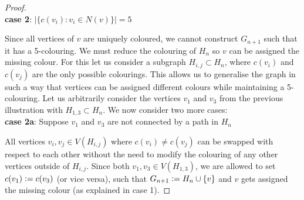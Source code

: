 \begin{proof}
$\phantom{x}$ \\
\textbf{case 2}: $|\{c(v_{i}) : v_{i} \in N(v)\}| = 5$

Since all vertices of $v$ are uniquely coloured, we cannot construct $G_{n + 1}$ such that it has a 5-colouring. We must reduce the colouring of $H_{n}$ so $v$ can be assigned the missing colour. For this let us consider a subgraph $H_{i, j} \subset H_{n}$, where $c(v_{i})$ and $c(v_{j})$ are the only possible colourings. This allows us to generalise the graph in such a way that vertices can be assigned different colours while maintaining a 5-colouring. Let us arbitrarily consider the vertices $v_{1}$ and $v_{3}$ from the previous illustration with $H_{1, 3} \subset H_{n}$. We now consider two more cases: \\
\textbf{case 2a}: Suppose $v_1$ and $v_3$ are not connected by a path in $H_{n}$

All vertices $v_i, v_j \in V(H_{i, j})$ where $c(v_i) \not = c(v_j)$ can be swapped with respect to each other without the need to modify the colouring of any other vertices outside of $H_{i, j}$. Since both $v_1, v_3 \in V(H_{1, 3})$, we are allowed to set $c(v_1) \vcentcolon= c(v_3)$ (or vice versa), such that $G_{n + 1} \vcentcolon= H_{n} \cup \{v\}$ and $v$ gets assigned the missing colour (as explained in case 1).


\end{proof}
